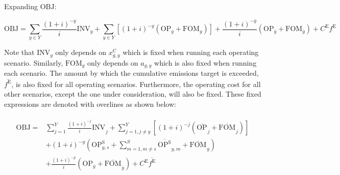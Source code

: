 \documentclass{article}
\newcommand{\sYears}{Y}
\newcommand{\sScenarios}{S}
\newcommand{\iGenerator}{g}
\newcommand{\iYear}{y}
\newcommand{\iYearTerminal}{\overline{\iYear}}
\newcommand{\iYearAlias}{j}
\newcommand{\iScenario}{s}
\newcommand{\iScenarioAlias}{m}
\newcommand{\cOperatingCost}[1][\iYear,\iScenario]{\mathrm{OP}_{#1}}
\newcommand{\cFixedOperationsMaintenanceCost}[1][\iGenerator]{\mathrm{FOM}_{#1}}
\newcommand{\cInvestmentCost}[1][\iYear]{\mathrm{INV}_{#1}}
\newcommand{\cInterestRate}{i}
\newcommand{\cEmissionsTargetViolationPenalty}{C^{\mathrm{E}}}
\newcommand{\cObjectiveFunction}{\mathrm{OBJ}}
\newcommand{\cOperatingCostScenario}[1][\iYear,\iScenario]{\mathrm{OP}^{\mathrm{\sScenarios}}_{#1}}
\newcommand{\vInstalledCapacity}[1][\iGenerator,\iYear]{x^{\mathrm{C}}_{#1}}
\newcommand{\vEmissionsTargetViolation}{f^{\mathrm{E}}}
\newcommand{\vInstalledCapacityTotal}[1][\iGenerator,\iYear]{a_{#1}}
\begin{document}
Expanding $\cObjectiveFunction$:

\begin{equation}
	\cObjectiveFunction = \sum\limits_{\iYear \in \sYears} \frac{(1+\cInterestRate)^{-\iYear}}{\cInterestRate}\cInvestmentCost + \sum\limits_{\iYear \in \sYears} \left[(1+\cInterestRate)^{-\iYear} (\cOperatingCost[\iYear] + \cFixedOperationsMaintenanceCost[\iYear]) \right] + \frac{(1+\cInterestRate)^{-\iYearTerminal}}{\cInterestRate} \left(\cOperatingCost[\iYearTerminal] + \cFixedOperationsMaintenanceCost[\iYearTerminal] \right) + \cEmissionsTargetViolationPenalty \vEmissionsTargetViolation
\end{equation}

Note that $\cInvestmentCost$ only depends on $\vInstalledCapacity$ which is fixed when running each operating scenario. Similarly, $\cFixedOperationsMaintenanceCost$ only depends on $\vInstalledCapacityTotal$ which is also fixed when running each scenario. The amount by which the cumulative emissions target is exceeded, $\overline{\vEmissionsTargetViolation}$, is also fixed for all operating scenarios. Furthermore, the operating cost for all other scenarios, except the one under consideration, will also be fixed. These fixed expressions are denoted with overlines as shown below:

\begin{align}
	\begin{split}
		\cObjectiveFunction = & \sum\limits_{\iYearAlias=1}^{\sYears} \frac{(1+\cInterestRate)^{-\iYearAlias}}{\cInterestRate}\overline{\cInvestmentCost[]}_{\iYearAlias} + \sum\limits_{\iYearAlias=1, \iYearAlias \neq \iYear}^{\sYears} \left[(1+\cInterestRate)^{-\iYearAlias} (\overline{\cOperatingCost[]}_{\iYearAlias} + \overline{\cFixedOperationsMaintenanceCost[]}_{\iYearAlias}) \right]\\
		& + (1 + \cInterestRate)^{-\iYear}\left(\cOperatingCostScenario + \sum\limits_{\iScenarioAlias = 1,\iScenarioAlias\neq \iScenario}^{\sScenarios}\overline{\cOperatingCostScenario[]}_{\iYear,\iScenarioAlias} + \overline{\cFixedOperationsMaintenanceCost[]}_{\iYear}\right)\\
		& + \frac{(1+\cInterestRate)^{-\iYearTerminal}}{\cInterestRate} \left(\cOperatingCost[\iYearTerminal] + \overline{\cFixedOperationsMaintenanceCost[]}_{\iYearTerminal} \right) + \cEmissionsTargetViolationPenalty \overline{\vEmissionsTargetViolation}\\
	\end{split}
\end{align}
\end{document}
